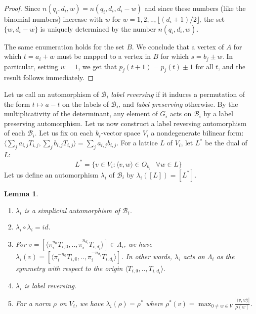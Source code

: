 \documentclass{amsart}
\theoremstyle{theorem}
\theoremstyle{lemma}
\newtheorem{lemma}{Lemma}[section]
\theoremstyle{prop}
\theoremstyle{definition}
\theoremstyle{corollary}
\theoremstyle{remark}
\newcommand{\B}{\mathcal{B}}
\begin{document}
\begin{proof}
Since $n({q_i},d_i,w)=n({q_i},d_i,d_i-w)$ and since these numbers (like the binomial numbers) increase with $w$ for $w=1,2,..,\lfloor(d_i+1)/2 \rfloor$, the set $\{w,d_i-w\}$ is uniquely determined by the number $n({q_i},d_i,w)$. 

The same enumeration holds for the set $B$. We conclude that a vertex of $A$ for which $t=a_i+w$ must be mapped to a vertex in $B$ for which $s=b_j\pm w$. In particular, setting $w=1$, we get that $p_j(t+1)=p_j(t)\pm 1$ for all $t$, and the result follows immediately.
\end{proof}

Let us call an automorphism of $\B_i$ \emph{label reversing} if it induces a permutation of the form $t \mapsto a-t$ on the labels of $\B_i$, and \emph{label preserving} otherwise. By the multiplicativity of the determinant, any element of $G_i$ acts on $\B_i$ by a label preserving automorphism. Let us now construct a label reversing automorphism of each $\B_i$. Let us fix on each $k_i$-vector space $V_i$ a nondegenerate bilinear form: $\langle \sum_j a_{i,j} T_{i,j}, \sum_j b_{i,j} T_{i,j} \rangle = \sum_j a_{i,j} b_{i,j}$. For a lattice $L$ of $V_i$, let $L^*$ be the dual of $L$: $$ L^* = \{ v\in V_i: \langle v,w\rangle \in O_{k_i} \text{ } \forall w\in L\} $$
Let us define an automorphism $\lambda_i$ of $\B_i$ by $\lambda_i([L])=[L^*]$. 
\begin{lemma} \label{involution}
\begin{enumerate}
\item $\lambda_i$ is a simplicial automorphism of $\B_i$.
\item $\lambda_i \circ \lambda_i = id$.
\item For $v=[\langle \pi_i^{n_0}T_{i,0}, .. ,\pi_i^{n_{d_i}}T_{i,d_i}\rangle] \in \Lambda_i$, we have $\lambda_i(v)=[\langle\pi_i^{-n_0}T_{i,0}, .. ,\pi_i^{-n_{d_i}}T_{i,d_i}\rangle]$. In other words, $\lambda_i$ acts on $\Lambda_i$ as the symmetry with respect to the origin $\langle T_{i,0},..,T_{i,d_i}\rangle$. 
\item $\lambda_i$ is label reversing. 
\item For a norm $\rho$ on $V_i$, we have $\lambda_i(\rho)=\rho^*$ where $ \rho^*(v)=\max_{0 \neq w\in V }\frac{|\langle v,w\rangle|}{\rho(w)}$.

\end{enumerate} \end{lemma}
\end{document}
